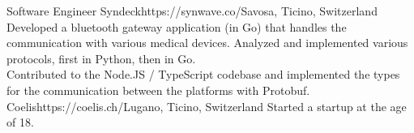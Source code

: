 \begin{CV}
        {Software Engineer}
        {Syndeck}{https://synwave.co/}{Savosa, Ticino, Switzerland}
        {Developed a bluetooth gateway application (in Go) that handles the communication with various
        medical devices. Analyzed and implemented various protocols, first in Python, then in Go.\vspace{0.2em}\\
        Contributed to the Node.JS / TypeScript codebase and implemented the types for the communication
        between the platforms with Protobuf.}
    {Coelis}{https://coelis.ch/}{Lugano, Ticino, Switzerland}
    {
        Started a startup at the age of 18.
    }
\end{CV}